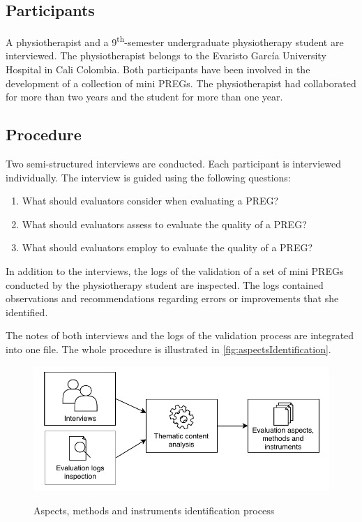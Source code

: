 \subsection{Participants}
A physiotherapist and a 9\textsuperscript{th}-semester undergraduate physiotherapy student are interviewed. The physiotherapist belongs to the Evaristo Garc\'ia University Hospital in Cali Colombia. Both participants have been involved in the development of a collection of mini \acp{PREG}. The physiotherapist had collaborated for more than two years and the student for more than one year.

\subsection{Procedure}
Two semi-structured interviews are conducted. Each participant is interviewed individually. The interview is guided using the following questions:

\begin{enumerate}
    \item What should evaluators consider when evaluating a \ac{PREG}?
    \item What should evaluators assess to evaluate the quality of a \ac{PREG}?
    \item What should evaluators employ to evaluate the quality of a \ac{PREG}?
\end{enumerate}
In addition to the interviews, the logs of the validation of a set of mini \acp{PREG} conducted by the physiotherapy student are inspected. The logs contained observations and recommendations regarding errors or improvements that she identified.

The notes of both interviews and the logs of the validation process are integrated into one file. The whole procedure is illustrated in \autoref{fig:aspectsIdentification}.

\begin{figure}[htb]
\myfloatalign
{\includegraphics[width=\linewidth]{gfx/aspects/aspectsIdentification}} \quad
\caption{Aspects, methods and instruments identification process}\label{fig:aspectsIdentification}
\end{figure}

